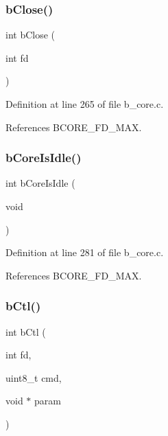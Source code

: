 \subsubsection{\texorpdfstring{b\+Close()}{bClose()}}
{\footnotesize\ttfamily int b\+Close (\begin{DoxyParamCaption}\item[{int}]{fd }\end{DoxyParamCaption})}



Definition at line 265 of file b\+\_\+core.\+c.



References B\+C\+O\+R\+E\+\_\+\+F\+D\+\_\+\+M\+AX.

\mbox{\label{group___c_o_r_e___exported___functions_ga2579ab6e79fad3d62796972ab85a14f0}} 
\subsubsection{\texorpdfstring{b\+Core\+Is\+Idle()}{bCoreIsIdle()}}
{\footnotesize\ttfamily int b\+Core\+Is\+Idle (\begin{DoxyParamCaption}\item[{void}]{ }\end{DoxyParamCaption})}



Definition at line 281 of file b\+\_\+core.\+c.



References B\+C\+O\+R\+E\+\_\+\+F\+D\+\_\+\+M\+AX.

\mbox{\label{group___c_o_r_e___exported___functions_gaf0a95eb51c436b56de56cdc63f5dab7c}} 
\subsubsection{\texorpdfstring{b\+Ctl()}{bCtl()}}
{\footnotesize\ttfamily int b\+Ctl (\begin{DoxyParamCaption}\item[{int}]{fd,  }\item[{uint8\+\_\+t}]{cmd,  }\item[{void $\ast$}]{param }\end{DoxyParamCaption})}



